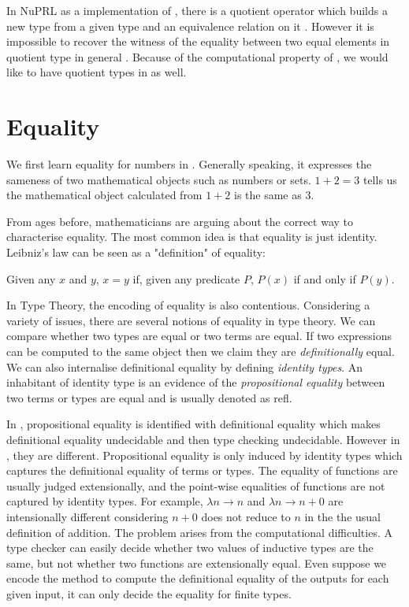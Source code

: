 In NuPRL as a implementation of \ett, there is a quotient operator which builds a new type from a given type and an equivalence relation on it \cite{DBLP:books/daglib/0068834}. However it is impossible to recover the witness of the equality between two equal elements in quotient type in general \cite{nog:02}.
Because of the computational property of \itt, we would like to have quotient types in \itt as well.








\section{Equality}

We first learn equality for numbers in \maths. Generally speaking, it
expresses the sameness of two mathematical objects such as numbers or sets.
$1+2=3$ tells us the mathematical object calculated from $1+2$ is the
same as $3$.

From ages before, mathematicians are arguing about the correct way to
characterise equality. The most common idea is that equality is just
identity. Leibniz's law can be seen as a "definition" of
equality:

Given any $x$ and $y$, $x = y$ if, given any predicate $P$, $P(x)$ if and only
if $P(y)$.

In Type Theory, the encoding of equality is also contentious. Considering a variety of issues, there are
several notions of equality in type theory.
We can compare whether two types are equal or two terms are equal. If two
expressions can be computed to the same object then we claim they are
 \emph{definitionally} equal.  
 We can also internalise definitional equality by defining \emph{identity types}. An inhabitant of identity type is an evidence of the \emph{propositional equality} between two terms or types are equal and is usually denoted as refl. 

In \ett, propositional equality is identified with definitional equality which makes definitional equality undecidable and then type checking undecidable. However in \itt, they are different. Propositional equality is only induced by identity types which captures the definitional equality of terms or types. The equality of functions are usually judged extensionally, and the point-wise equalities of functions are not captured by identity types. For example, $\lambda n \to n$ and $\lambda n \to n + 0$ are intensionally different considering $n+0$ does not reduce to $n$ in the the usual definition of addition.
The problem arises from the computational difficulties. A type checker can easily decide whether two
values of inductive types are the same, but not whether two functions
are extensionally equal. Even suppose we encode the method to compute
the definitional equality of the outputs for each given input, it can
only decide the equality for finite types.

